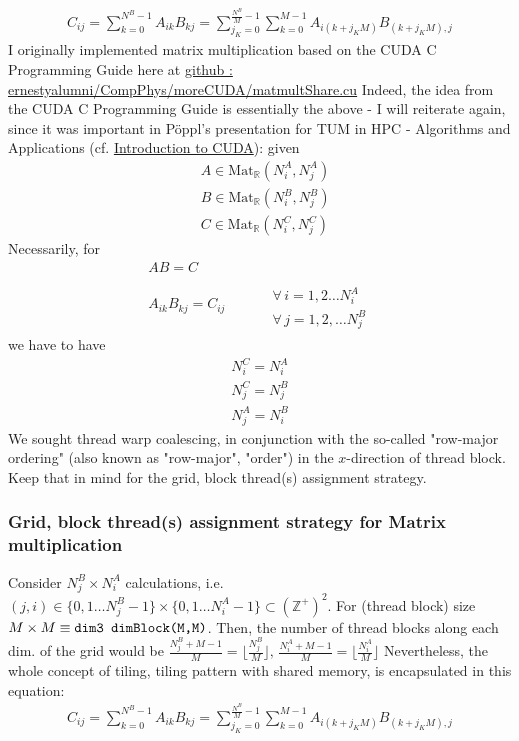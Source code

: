 \documentclass[10pt]{amsart}
\begin{document}
\begin{multicols*}{2}
\[
\begin{gathered}
C_{ij} = \sum_{k=0}^{N^B-1} A_{ik} B_{kj} = \sum_{j_K=0}^{\frac{N^B}{M}-1} \sum_{k=0}^{M-1} A_{i(k+j_KM)}B_{(k+j_KM), j}
\end{gathered}
\]
I originally implemented matrix multiplication based on the CUDA C Programming Guide here at \href{https://github.com/ernestyalumni/CompPhys/blob/master/moreCUDA/matmultShare.cu}{github : ernestyalumni/CompPhys/moreCUDA/matmultShare.cu}
Indeed, the idea from the CUDA C Programming Guide is essentially the above - I will reiterate again, since it was important in P\"oppl's presentation for TUM in HPC - Algorithms and Applications (cf. \href{http://www5.in.tum.de/lehre/vorlesungen/hpc/WS16/tutorial/cuda_p2.pdf}{Introduction to CUDA}): given
\[
\begin{aligned}
& A \in \text{Mat}_{\mathbb{R}}(N_i^A,N_j^A) \\ 
& B \in \text{Mat}_{\mathbb{R}}(N_i^B,N_j^B) \\
& C \in \text{Mat}_{\mathbb{R}}(N_i^C,N_j^C) 
\end{aligned}
\]
Necessarily, for 
\begin{equation}
\begin{gathered}
AB=C \\
A_{ik}B_{kj} =C_{ij}  \qquad \, \begin{aligned} & \qquad \\ 
& \forall \, i = 1,2\dots N_i^A \\ 
& \forall \, j = 1,2,\dots N_j^B \end{aligned}
\end{gathered}
\end{equation}
we have to have 
\[
\begin{gathered}
N_i^C = N_i^A \\
N_j^C = N_j^B \\
N_j^A = N^B_i
\end{gathered}
\]
We sought thread warp coalescing, in conjunction with the so-called "row-major ordering" (also known as "row-major", "order") in the $x$-direction of thread block.  Keep that in mind for the grid, block thread(s) assignment strategy.  
\subsubsection{Grid, block thread(s) assignment strategy for Matrix multiplication} 
Consider $N_j^B \times N_i^A$ calculations, i.e. $(j,i) \in \lbrace 0,1\dots N_j^B - 1\rbrace \times \lbrace 0 ,1\dots N_i^A -1\rbrace \subset (\mathbb{Z}^+)^2 $.  
For (thread block) size $M\times M \equiv \verb|dim3 dimBlock(M,M)|$.  
Then, the number of thread blocks along each dim. of the grid would be $\frac{N_j^B+M-1}{M} = \lfloor \frac{N_j^B}{M} \rfloor , \, \frac{N_i^A + M-1}{M} = \lfloor \frac{N_i^A}{M} \rfloor $  
Nevertheless, the whole concept of tiling, tiling pattern with shared memory, is encapsulated in this equation:
\begin{equation}
\begin{gathered}
C_{ij} = \sum_{k=0}^{N^B-1} A_{ik} B_{kj} = \sum_{j_K=0}^{\frac{N^B}{M}-1} \sum_{k=0}^{M-1} A_{i(k+j_KM)}B_{(k+j_KM), j}
\end{gathered}
\end{equation}

\end{multicols*}
\end{document}
